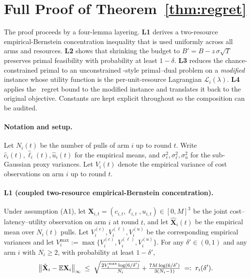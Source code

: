 \section{Full Proof of Theorem~\ref{thm:regret}}
\label{app:proof}

The proof proceeds by a four-lemma layering. \textbf{L1} derives a
two-resource empirical-Bernstein concentration inequality that is used
uniformly across all arms and resources. \textbf{L2} shows that
shrinking the budget to $B' = B - z\,\sigma\sqrt{T}$ preserves primal
feasibility with probability at least $1-\delta$. \textbf{L3} reduces
the chance-constrained primal to an unconstrained \BwK-style
primal--dual problem on a \emph{modified} instance whose utility
function is the per-unit-resource Lagrangian
$\mathcal{L}_i(\lambda)$. \textbf{L4} applies the \BwK~regret bound to
the modified instance and translates it back to the original objective.
Constants are kept explicit throughout so the composition can be
audited.

\paragraph{Notation and setup.}
Let $N_i(t)$ be the number of pulls of arm $i$ up to round $t$. Write
$\hat{c}_i(t), \hat{\ell}_i(t), \hat{u}_i(t)$ for the empirical means,
and $\sigma^2_c, \sigma^2_\ell, \sigma^2_u$ for the sub-Gaussian proxy
variances. Let $V_i(t)$ denote the empirical variance of cost
observations on arm $i$ up to round $t$.

\paragraph{L1 (coupled two-resource empirical-Bernstein concentration).}
Under assumption (A1), let
$\mathbf{X}_{i,t} = (c_{i,t}, \ell_{i,t}, u_{i,t}) \in [0, M]^3$ be the
joint cost--latency--utility observation on arm $i$ at round $t$, and
let $\hat{\mathbf{X}}_i(t)$ be the empirical mean over $N_i(t)$ pulls.
Let $V_i^{(c)}, V_i^{(\ell)}, V_i^{(u)}$ be the corresponding empirical
variances and let
$V_i^{\max} := \max\{V_i^{(c)}, V_i^{(\ell)}, V_i^{(u)}\}$.
For any $\delta' \in (0, 1)$ and any arm $i$ with $N_i \ge 2$, with
probability at least $1 - \delta'$,
\begin{equation}
\label{eq:L1}
  \bigl\| \hat{\mathbf{X}}_i - \mathbb{E} \mathbf{X}_i \bigr\|_\infty
   \;\le\;
    \sqrt{\tfrac{2 V_i^{\max} \log(6/\delta')}{N_i}}
     + \tfrac{7 M \log(6/\delta')}{3 (N_i - 1)}
   \;=:\;
    r_i(\delta').
\end{equation}


